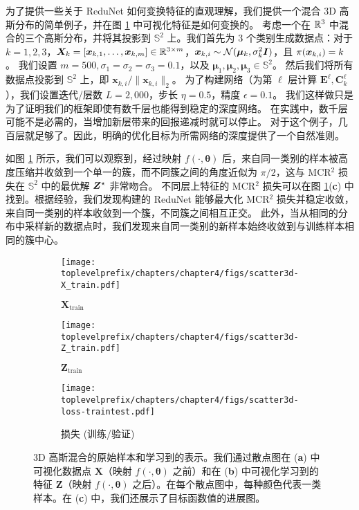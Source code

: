 \documentclass[../../book-main.tex]{subfiles}
\begin{document}
\begin{example}
为了提供一些关于 ReduNet 如何变换特征的直观理解，我们提供一个混合 3D 高斯分布的简单例子，并在图 \ref{fig:redu-3d-gaussian-diagram} 中可视化特征是如何变换的。
考虑一个在 $\mathbb{R}^{3}$ 中混合的三个高斯分布，并将其投影到 $\mathbb{S}^2$ 上。我们首先为 3 个类别生成数据点：对于 $k=1,2,3$，$\bm{X}_{k}=[\bm{x}_{k,1}, \ldots, \bm{x}_{k,m}] \in \mathbb{R}^{3\times m}$，$\bm{x}_{k,i} \sim \mathcal{N}(\bm{\mu}_{k}, \sigma_{k}^{2} \bm{I})$，且 ${\pi}(\bm{x}_{k,i}) = k$。
我们设置 $m=500, \sigma_{1}=\sigma_{2}=\sigma_{3}=0.1$，以及 $\bm{\mu}_{1}, \bm{\mu}_{2}, \bm{\mu}_{3} \in \mathbb{S}^2$。
然后我们将所有数据点投影到 $\mathbb{S}^{2}$ 上，即 $\bm{x}_{k,i}/\|\bm{x}_{k,i}\|_{2}$。
为了构建网络（为第 $\ell$ 层计算 $\bm{E}^{\ell}, \bm{C}^{\ell}_{k}$），我们设置迭代/层数 $L=2,000$，步长 $\eta=0.5$，精度 $\epsilon=0.1$。
我们这样做只是为了证明我们的框架即使有数千层也能得到稳定的深度网络。
在实践中，数千层可能不是必需的，当增加新层带来的回报递减时就可以停止。
对于这个例子，几百层就足够了。因此，明确的优化目标为所需网络的深度提供了一个自然准则。

如图 \ref{fig:redu-3d-gaussian-diagram} 所示，我们可以观察到，经过映射 $f(\cdot, \bm{\theta})$ 后，来自同一类别的样本被高度压缩并收敛到一个单一的簇，而不同簇之间的角度近似为 $\pi/2$，这与 MCR$^2$ 损失在 $\mathbb{S}^2$ 中的最优解 $\bm{Z}^{\star}$ 非常吻合。
不同层上特征的 MCR$^2$ 损失可以在图 \ref{fig:redu-3d-gaussian-diagram}(\textbf{c}) 中找到。根据经验，我们发现构建的 ReduNet 能够最大化 MCR$^2$ 损失并稳定收敛，来自同一类别的样本收敛到一个簇，不同簇之间相互正交。
此外，当从相同的分布中采样新的数据点时，我们发现来自同一类别的新样本始终收敛到与训练样本相同的簇中心。
\begin{figure}[t]
    \begin{subfigure}[t]{0.32\textwidth}
        \centering
        \texttt{[image: \\toplevelprefix/chapters/chapter4/figs/scatter3d-X\_train.pdf]}\vspace{-0.1in}
        \caption{$\bm{X}_{\text{train}}$}
    \end{subfigure}
    \hfill
    \begin{subfigure}[t]{0.32\textwidth}
        \centering
        \texttt{[image: \\toplevelprefix/chapters/chapter4/figs/scatter3d-Z\_train.pdf]}\vspace{-0.1in}
        \caption{$\bm{Z}_{\text{train}}$}
    \end{subfigure}
    \hfill
    \begin{subfigure}[t]{0.32\textwidth}
        \centering
        \texttt{[image: \\toplevelprefix/chapters/chapter4/figs/scatter3d-loss-traintest.pdf]}\vspace{-0.1in}
        \caption{损失 (训练/验证)}
    \end{subfigure}
    \vspace{-0.1in}
    \caption{\small 3D 高斯混合的原始样本和学习到的表示。我们通过散点图在 (\textbf{a}) 中可视化数据点 $\bm{X}$（映射 $f(\cdot, \bm{\theta})$ 之前）和在 (\textbf{b}) 中可视化学习到的特征 $\bm{Z}$（映射 $f(\cdot, \bm{\theta})$ 之后）。在每个散点图中，每种颜色代表一类样本。在 (\textbf{c}) 中，我们还展示了目标函数值的进展图。}
    \label{fig:redu-3d-gaussian-diagram}
\end{figure}


\end{example}
\end{document}
